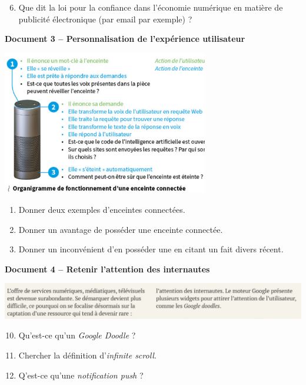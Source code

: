 \documentclass[a4paper]{article}
\begin{document}
\begin{enumerate}
  \setcounter{enumi}{5}
\item Que dit la loi pour la confiance dans l'économie numérique en matière de publicité électronique (par email par exemple) ?
\end{enumerate}

\pagebreak

\textbf{Document 3 -- Personnalisation de l'expérience utilisateur} 

\medskip

\begin{multicols}{2}
  \begin{center}
    \includegraphics[width=9cm]{enceinte_connectee.png} 
  \end{center}\columnbreak
  \begin{enumerate}[resume]
    \item Donner deux exemples d'enceintes connectées.
    \item Donner un avantage de posséder une enceinte connectée.
    \item Donner un inconvénient d'en posséder une en citant un fait divers récent.
  \end{enumerate}
\end{multicols}

\bigskip

\textbf{Document 4 -- Retenir l'attention des internautes} 

\begin{center}
  \includegraphics[width=16cm]{attention_internautes.png}
\end{center}

\begin{enumerate}[resume]
  \setcounter{enumi}{9}
  \item Qu'est-ce qu'un \textit{Google Doodle} ?
  \item Chercher la définition d'\textit{infinite scroll}.
  \item Q'est-ce qu'une \textit{notification push} ?
\end{enumerate}
\end{document}
